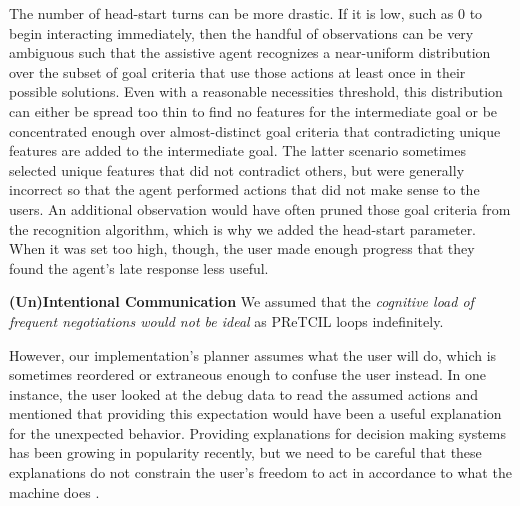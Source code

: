 \documentclass[letterpaper]{article} %
\begin{document}
The number of head-start turns can be more drastic.  If it is low, such as $0$ to begin interacting immediately, then the handful of observations can be very ambiguous such that the assistive agent recognizes a near-uniform distribution over the subset of goal criteria that use those actions at least once in their possible solutions.  Even with a reasonable necessities threshold, this distribution can either be spread too thin to find no features for the intermediate goal or be concentrated enough over almost-distinct goal criteria that contradicting unique features are added to the intermediate goal.  The latter scenario sometimes selected unique features that did not contradict others, but were generally incorrect so that the agent performed actions that did not make sense to the users.  An additional observation would have often pruned those goal criteria from the recognition algorithm, which is why we added the head-start parameter.  When it was set too high, though, the user made enough progress that they found the agent's late response less useful. %



\textbf{(Un)Intentional Communication} We assumed that the \textit{cognitive load of frequent negotiations would not be ideal} as {\sc PReTCIL} loops indefinitely.

However, our implementation's planner assumes what the user will do, which is sometimes reordered or extraneous enough to confuse the user instead.  In one instance, the user looked at the debug data to read the assumed actions and mentioned that providing this expectation would have been a useful explanation for the unexpected behavior.  Providing explanations for decision making systems \cite{xaip} has been growing in popularity recently, but we need to be careful that these explanations do not constrain the user's freedom to act in accordance to what the machine does \cite{DBLP:conf/aaaifs/CastroRMB17}.
\end{document}
